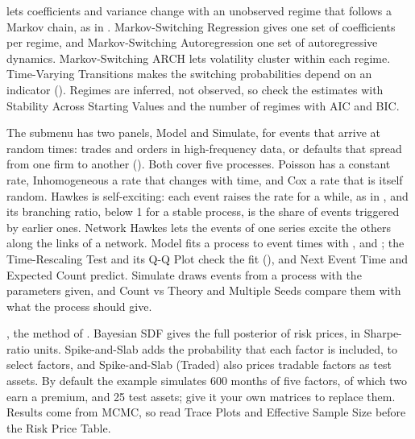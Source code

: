  lets coefficients and variance change with an unobserved regime that follows a Markov chain, as in . Markov-Switching Regression gives one set of coefficients per regime, and Markov-Switching Autoregression one set of autoregressive dynamics. Markov-Switching ARCH lets volatility cluster within each regime. Time-Varying Transitions makes the switching probabilities depend on an indicator (). Regimes are inferred, not observed, so check the estimates with Stability Across Starting Values and the number of regimes with AIC and BIC.

The submenu  has two panels, Model and Simulate, for events that arrive at random times: trades and orders in high-frequency data, or defaults that spread from one firm to another (). Both cover five processes. Poisson has a constant rate, Inhomogeneous a rate that changes with time, and Cox a rate that is itself random. Hawkes is self-exciting: each event raises the rate for a while, as in , and its branching ratio, below 1 for a stable process, is the share of events triggered by earlier ones. Network Hawkes lets the events of one series excite the others along the links of a network. Model fits a process to event times with ,  and ; the Time-Rescaling Test and its Q-Q Plot check the fit (), and Next Event Time and Expected Count predict. Simulate draws events from a process with the parameters given, and Count vs Theory and Multiple Seeds compare them with what the process should give.

, the method of . Bayesian SDF gives the full posterior of risk prices, in Sharpe-ratio units. Spike-and-Slab adds the probability that each factor is included, to select factors, and Spike-and-Slab (Traded) also prices tradable factors as test assets. By default the example simulates 600 months of five factors, of which two earn a premium, and 25 test assets; give it your own matrices to replace them. Results come from MCMC, so read Trace Plots and Effective Sample Size before the Risk Price Table.

